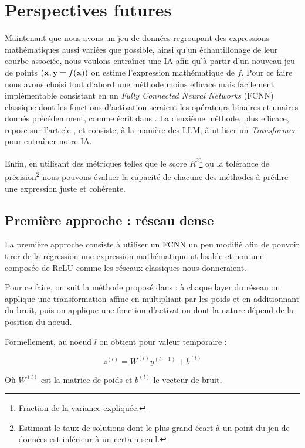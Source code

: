 \documentclass[a4paper,12pt]{article}
\begin{document}
\section{Perspectives futures}

Maintenant que nous avons un jeu de données regroupant des expressions mathématiques aussi variées que possible, ainsi qu'un échantillonage de leur courbe associée, nous voulons entraîner une IA afin qu'à partir d'un nouveau jeu de points $(\vb x,\vb y = f(\vb x))$ on estime l'expression mathématique de $f$. Pour ce faire nous avons choisi tout d'abord une méthode moins efficace mais facilement implémentable consistant en un \textit{Fully Connected Neural Networks} (FCNN) classique dont les fonctions d'activation seraient les opérateurs binaires et unaires donnés précédemment, comme écrit dans \cite{gmartius}. La deuxième méthode, plus efficace, repose sur l'article \cite{kamienny}, et consiste, à la manière des LLM, à utiliser un \emph{Transformer} pour entraîner notre IA.

Enfin, en utilisant des métriques telles que le score $R^2$\footnote{Fraction de la variance expliquée.} ou la tolérance de précision\footnote{Estimant le taux de solutions dont le plus grand écart à un point du jeu de données est inférieur à un certain seuil.} nous pouvons évaluer la capacité de chacune des méthodes à prédire une expression juste et cohérente.

\subsection{{\color{red}Première approche : réseau dense}}

La première approche consiste à utiliser un FCNN un peu modifié afin de pouvoir tirer de la régression une expression mathématique utilisable et non une composée de ReLU comme les réseaux classiques nous donneraient.

Pour ce faire, on suit la méthode proposé dans \cite{gmartius} : à chaque layer du réseau on applique une transformation affine en multipliant par les poids et en additionnant du bruit, puis on applique une fonction d'activation dont la nature dépend de la position du noeud.

Formellement, au noeud $l$ on obtient pour valeur temporaire :

\begin{equation*}
    z^{(l)} = W^{(l)} y^{(l-1)} + b^{(l)}
\end{equation*}

Où $W^{(l)}$ est la matrice de poids et $b^{(l)}$ le vecteur de bruit.
\end{document}
